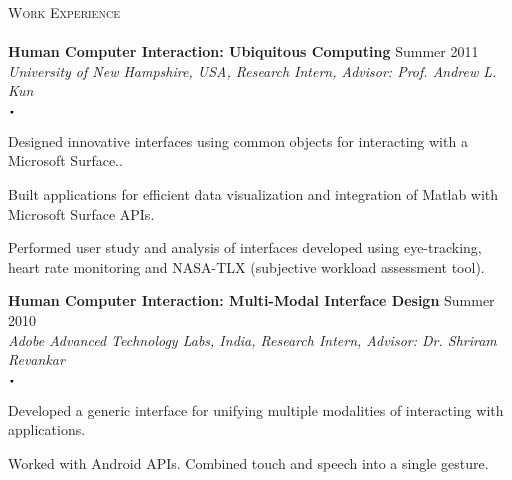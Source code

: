 \documentclass{article}
\newcommand{\sbt}{\,\begin{picture}(-1,1)(-1,-3)\circle*{2}\end{picture}\ }
\newcommand{\lineunder}{\vspace*{-8pt} \\ \hspace*{-18pt} \hrulefill \\}
\newcommand{\header}[1]{{\hspace*{-15pt}\vspace*{6pt} \textsc{#1}} \vspace*{-6pt} \lineunder}
\newcommand{\employer}[3]{{ \textbf{#1} \hfill #2\\ {{\emph{#3}}}\\  }}
\newenvironment{achievements}{\begin{list}{$\sbt$}{\topsep -2pt \itemsep -2pt}}{\vspace*{0pt}\end{list}}
\begin{document}
\header{Work Experience}
\employer{Human Computer Interaction: Ubiquitous Computing}{Summer 2011}{University of New Hampshire, USA, Research Intern, Advisor: Prof. Andrew L. Kun}
	\begin{achievements}
	\item Designed innovative interfaces using common objects for interacting with a Microsoft Surface..
	\item Built applications for efficient data visualization and integration of Matlab with Microsoft Surface APIs.
	\item Performed user study and analysis of interfaces developed using eye-tracking, heart rate monitoring and NASA-TLX (subjective workload assessment tool).
	\end{achievements}

\employer{Human Computer Interaction: Multi-Modal Interface Design}{Summer 2010}{ Adobe Advanced Technology Labs, India, Research Intern, Advisor: Dr. Shriram Revankar}
	\begin{achievements}
	\item Developed a generic interface for unifying multiple modalities of interacting with applications.
	\item Worked with Android APIs. Combined touch and speech into a single gesture.
	\end{achievements}
	
\end{document}
